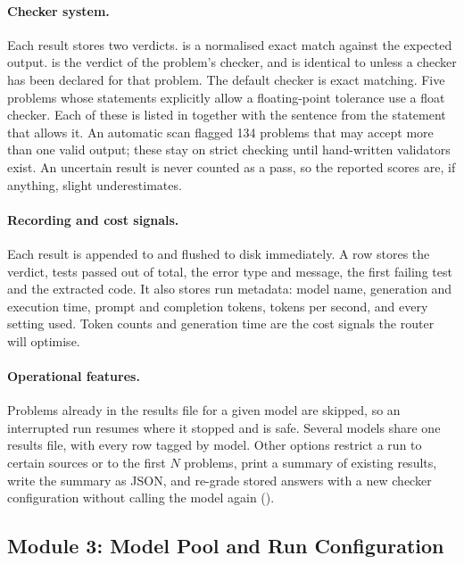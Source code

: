 \paragraph{Checker system.} Each result stores two verdicts.  is a normalised exact match against the expected output.  is the verdict of the problem's checker, and is identical to  unless a checker has been declared for that problem. The default checker is exact matching. Five problems whose statements explicitly allow a floating-point tolerance use a float checker. Each of these is listed in  together with the sentence from the statement that allows it. An automatic scan flagged 134 problems that may accept more than one valid output; these stay on strict checking until hand-written validators exist. An uncertain result is never counted as a pass, so the reported scores are, if anything, slight underestimates.

\paragraph{Recording and cost signals.} Each result is appended to  and flushed to disk immediately. A row stores the verdict, tests passed out of total, the error type and message, the first failing test and the extracted code. It also stores run metadata: model name, generation and execution time, prompt and completion tokens, tokens per second, and every setting used. Token counts and generation time are the cost signals the router will optimise.

\paragraph{Operational features.} Problems already in the results file for a given model are skipped, so an interrupted run resumes where it stopped and  is safe. Several models share one results file, with every row tagged by model. Other options restrict a run to certain sources or to the first $N$ problems, print a summary of existing results, write the summary as JSON, and re-grade stored answers with a new checker configuration without calling the model again ().

\subsection{Module 3: Model Pool and Run Configuration}
\label{sec:models}

